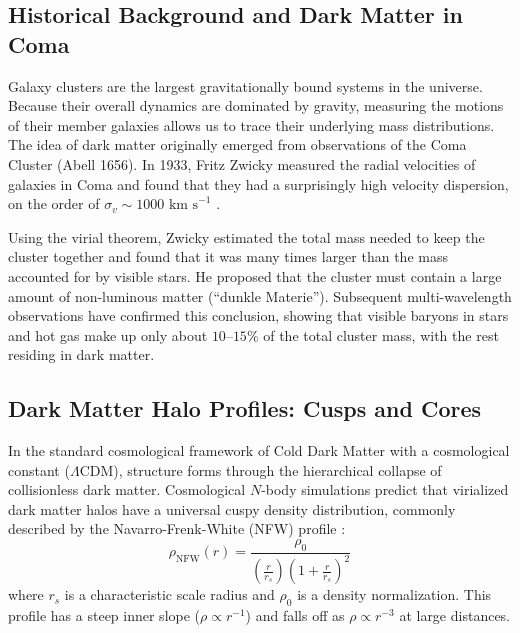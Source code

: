 \documentclass[twocolumn]{aastex631}
\begin{document}
\subsection{Historical Background and Dark Matter in Coma}
Galaxy clusters are the largest gravitationally bound systems in the universe. Because their overall dynamics are dominated by gravity, measuring the motions of their member galaxies allows us to trace their underlying mass distributions. The idea of dark matter originally emerged from observations of the Coma Cluster (Abell 1656). In 1933, Fritz Zwicky measured the radial velocities of galaxies in Coma and found that they had a surprisingly high velocity dispersion, on the order of $\sigma_v \sim 1000\text{ km s}^{-1}$ \citep{zwicky1933}. 

Using the virial theorem, Zwicky estimated the total mass needed to keep the cluster together and found that it was many times larger than the mass accounted for by visible stars. He proposed that the cluster must contain a large amount of non-luminous matter (``dunkle Materie''). Subsequent multi-wavelength observations have confirmed this conclusion, showing that visible baryons in stars and hot gas make up only about $10\text{--}15\%$ of the total cluster mass, with the rest residing in dark matter.

\subsection{Dark Matter Halo Profiles: Cusps and Cores}
In the standard cosmological framework of Cold Dark Matter with a cosmological constant ($\Lambda\text{CDM}$), structure forms through the hierarchical collapse of collisionless dark matter. Cosmological $N$-body simulations predict that virialized dark matter halos have a universal cuspy density distribution, commonly described by the Navarro-Frenk-White (NFW) profile \citep{navarro1997}:
\begin{equation}
	\rho_{\text{NFW}}(r) = \frac{\rho_0}{\left(\frac{r}{r_s}\right) \left(1 + \frac{r}{r_s}\right)^2}
\end{equation}
where $r_s$ is a characteristic scale radius and $\rho_0$ is a density normalization. This profile has a steep inner slope ($\rho \propto r^{-1}$) and falls off as $\rho \propto r^{-3}$ at large distances.
\end{document}
